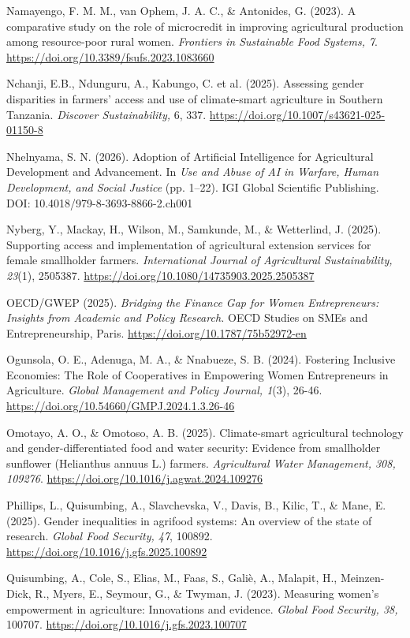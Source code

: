\documentclass[
]{article}
\begin{document}
Namayengo, F. M. M., van Ophem, J. A. C., \& Antonides, G. (2023). A
comparative study on the role of microcredit in improving agricultural
production among resource-poor rural women. \emph{Frontiers in
Sustainable Food Systems, 7}.
\url{https://doi.org/10.3389/fsufs.2023.1083660}

Nchanji, E.B., Ndunguru, A., Kabungo, C. et al\emph{.} (2025). Assessing
gender disparities in farmers' access and use of climate-smart
agriculture in Southern Tanzania. \emph{Discover Sustainability,} 6,
337. \url{https://doi.org/10.1007/s43621-025-01150-8}

Nhelnyama, S. N. (2026). Adoption of Artificial Intelligence for
Agricultural Development and Advancement. In \emph{Use and Abuse of AI
in Warfare, Human Development, and Social Justice} (pp. 1--22). IGI
Global Scientific Publishing. DOI: 10.4018/979-8-3693-8866-2.ch001

Nyberg, Y., Mackay, H., Wilson, M., Samkunde, M., \& Wetterlind, J.
(2025). Supporting access and implementation of agricultural extension
services for female smallholder farmers. \emph{International Journal of
Agricultural Sustainability, 23}(1), 2505387.
\url{https://doi.org/10.1080/14735903.2025.2505387}

OECD/GWEP (2025). \emph{Bridging the Finance Gap for Women
Entrepreneurs: Insights from Academic and Policy Research.} OECD Studies
on SMEs and Entrepreneurship, Paris.
\url{https://doi.org/10.1787/75b52972-en}

Ogunsola, O. E., Adenuga, M. A., \& Nnabueze, S. B. (2024). Fostering
Inclusive Economies: The Role of Cooperatives in Empowering Women
Entrepreneurs in Agriculture. \emph{Global Management and Policy
Journal, 1}(3), 26-46.
\url{https://doi.org/10.54660/GMPJ.2024.1.3.26-46}

Omotayo, A. O., \& Omotoso, A. B. (2025). Climate-smart agricultural
technology and gender-differentiated food and water security: Evidence
from smallholder sunflower (Helianthus annuus L.) farmers.
\emph{Agricultural Water Management, 308, 109276}.
\url{https://doi.org/10.1016/j.agwat.2024.109276}

Phillips, L., Quisumbing, A., Slavchevska, V., Davis, B., Kilic, T., \&
Mane, E. (2025). Gender inequalities in agrifood systems: An overview of
the state of research. \emph{Global Food Security, 47}, 100892.
\url{https://doi.org/10.1016/j.gfs.2025.100892}

Quisumbing, A., Cole, S., Elias, M., Faas, S., Galiè, A., Malapit, H.,
Meinzen-Dick, R., Myers, E., Seymour, G., \& Twyman, J. (2023).
Measuring women's empowerment in agriculture: Innovations and evidence.
\emph{Global Food Security, 38,} 100707.
\url{https://doi.org/10.1016/j.gfs.2023.100707}
\end{document}
